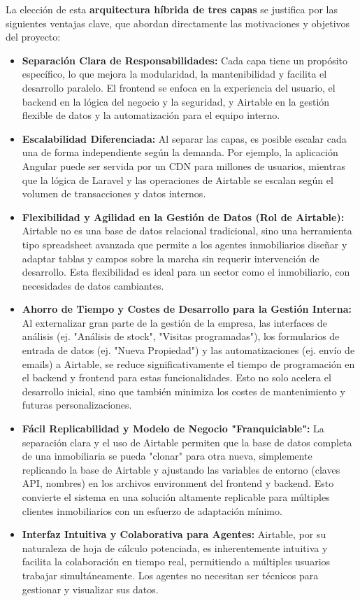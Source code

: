 La elección de esta \textbf{arquitectura híbrida de tres capas} se justifica por las siguientes ventajas clave, que abordan directamente las motivaciones y objetivos del proyecto:
\begin{itemize}
    \item \textbf{Separación Clara de Responsabilidades:} Cada capa tiene un propósito específico, lo que mejora la modularidad, la mantenibilidad y facilita el desarrollo paralelo. El frontend se enfoca en la experiencia del usuario, el backend en la lógica del negocio y la seguridad, y Airtable en la gestión flexible de datos y la automatización para el equipo interno.
    \item \textbf{Escalabilidad Diferenciada:} Al separar las capas, es posible escalar cada una de forma independiente según la demanda. Por ejemplo, la aplicación Angular puede ser servida por un CDN para millones de usuarios, mientras que la lógica de Laravel y las operaciones de Airtable se escalan según el volumen de transacciones y datos internos.
    \item \textbf{Flexibilidad y Agilidad en la Gestión de Datos (Rol de Airtable):} Airtable no es una base de datos relacional tradicional, sino una herramienta tipo spreadsheet avanzada que permite a los agentes inmobiliarios diseñar y adaptar tablas y campos sobre la marcha sin requerir intervención de desarrollo. Esta flexibilidad es ideal para un sector como el inmobiliario, con necesidades de datos cambiantes.
    \item \textbf{Ahorro de Tiempo y Costes de Desarrollo para la Gestión Interna:} Al externalizar gran parte de la gestión de la empresa, las interfaces de análisis (ej. "Análisis de stock", "Visitas programadas"), los formularios de entrada de datos (ej. "Nueva Propiedad") y las automatizaciones (ej. envío de emails) a Airtable, se reduce significativamente el tiempo de programación en el backend y frontend para estas funcionalidades. Esto no solo acelera el desarrollo inicial, sino que también minimiza los costes de mantenimiento y futuras personalizaciones.
    \item \textbf{Fácil Replicabilidad y Modelo de Negocio "Franquiciable":} La separación clara y el uso de Airtable permiten que la base de datos completa de una inmobiliaria se pueda "clonar" para otra nueva, simplemente replicando la base de Airtable y ajustando las variables de entorno (claves API, nombres) en los archivos environment del frontend y backend. Esto convierte el sistema en una solución altamente replicable para múltiples clientes inmobiliarios con un esfuerzo de adaptación mínimo.
    \item \textbf{Interfaz Intuitiva y Colaborativa para Agentes:} Airtable, por su naturaleza de hoja de cálculo potenciada, es inherentemente intuitiva y facilita la colaboración en tiempo real, permitiendo a múltiples usuarios trabajar simultáneamente. Los agentes no necesitan ser técnicos para gestionar y visualizar sus datos.
\end{itemize}

